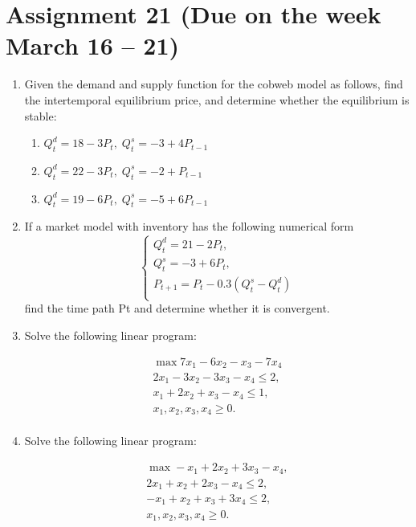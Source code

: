 \documentclass[12pt]{article} %
\theoremstyle{definition} %
\begin{document}
\section{Assignment 21 (Due on the week March 16 – 21)}

\begin{enumerate}

\item Given the demand and supply function for the cobweb model as follows, find the intertemporal
equilibrium price, and determine whether the equilibrium is stable:
\begin{enumerate}
\item $Q^d_t = 18 - 3P_t, \; Q^s_t = -3 + 4P_{t-1}$
\item $Q^d_t = 22 - 3P_t, \; Q^s_t = -2 + P_{t-1}$
\item $Q^d_t = 19 - 6P_t, \; Q^s_t = -5 + 6P_{t-1}$
\end{enumerate}


\item If a market model with inventory has the following numerical form
\[
\begin{cases}
Q^d_t = 21 - 2P_t, \\
Q^s_t = -3 + 6P_t, \\
P_{t+1} = P_t - 0.3(Q^s_t - Q^d_t) \\
\end{cases}
\]
find the time path Pt and determine whether it is convergent.

\item Solve the following linear program:

\[
\begin{array}{l}
\max 7x_1 - 6x_2 - x_3 - 7x_4 \\
2x_1 - 3x_2 - 3x_3 - x_4 \leq 2, \\
x_1 + 2x_2 + x_3 - x_4 \leq 1, \\
x_1, x_2, x_3, x_4 \geq 0. \\
\end{array}
\]

\item Solve the following linear program:

\[
\begin{array}{l}
\max -x_1 + 2x_2 + 3x_3 - x_4, \\
2x_1 + x_2 + 2x_3 - x_4 \leq 2, \\
-x_1 + x_2 + x_3 + 3x_4 \leq 2, \\
x_1, x_2, x_3, x_4 \geq 0. \\
\end{array}
\]


\end{enumerate}
\end{document}
